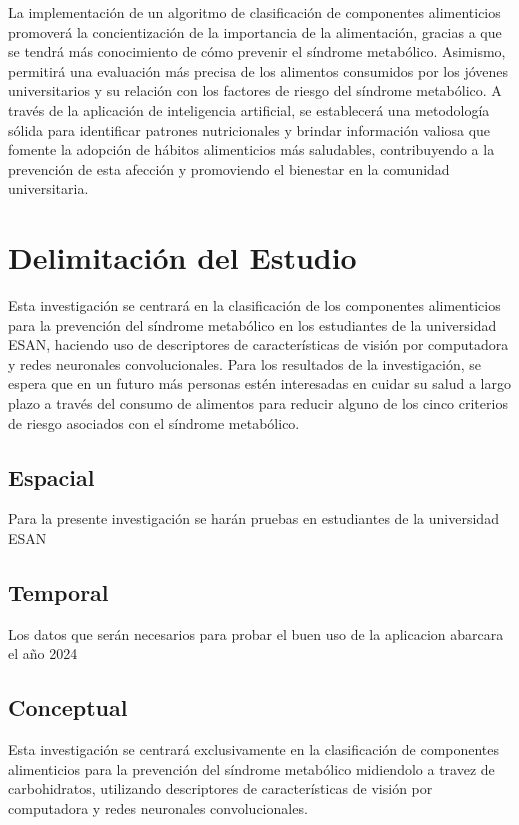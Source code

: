 La implementación de un algoritmo de clasificación de componentes alimenticios promoverá la concientización de la importancia de la alimentación, gracias a que se tendrá más conocimiento de cómo prevenir el síndrome metabólico. Asimismo, permitirá una evaluación más precisa de los alimentos consumidos por los jóvenes universitarios y su relación con los factores de riesgo del síndrome metabólico. A través de la aplicación de inteligencia artificial, se establecerá una metodología sólida para identificar patrones nutricionales y brindar información valiosa que fomente la adopción de hábitos alimenticios más saludables, contribuyendo a la prevención de esta afección y promoviendo el bienestar en la comunidad universitaria.

\section{Delimitación del Estudio}

Esta investigación se centrará en la clasificación de los componentes alimenticios para la prevención del síndrome metabólico en los estudiantes de la universidad ESAN, haciendo uso de descriptores de características de visión por computadora y redes neuronales convolucionales. Para los resultados de la investigación, se espera que en un futuro más personas estén interesadas en cuidar su salud a largo plazo a través del consumo de alimentos para reducir alguno de los cinco criterios de riesgo asociados con el síndrome metabólico.

\subsection{Espacial}
Para la presente investigación se harán pruebas en estudiantes de la universidad ESAN

\subsection{Temporal}
Los datos que serán necesarios para probar el buen uso de la aplicacion abarcara el año 2024

\subsection{Conceptual}
Esta investigación se centrará exclusivamente en la clasificación de componentes alimenticios para la prevención del síndrome metabólico midiendolo a travez de carbohidratos, utilizando descriptores de características de visión por computadora y redes neuronales convolucionales.


